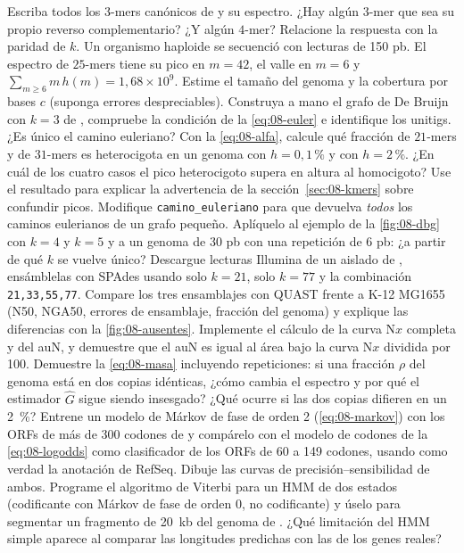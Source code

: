 \begin{ejercicios}
 Escriba todos los $3$-mers canónicos de  y su espectro. ¿Hay algún $3$-mer que sea su propio reverso complementario? ¿Y algún $4$-mer? Relacione la respuesta con la paridad de $k$.
 Un organismo haploide se secuenció con lecturas de 150 pb. El espectro de $25$-mers tiene su pico en $m=42$, el valle en $m=6$ y $\sum_{m\ge6} m\,h(m)=1{,}68\times10^{9}$. Estime el tamaño del genoma y la cobertura por bases $c$ (suponga errores despreciables).
 Construya a mano el grafo de De Bruijn con $k=3$ de , compruebe la condición de la \cref{eq:08-euler} e identifique los unitigs. ¿Es único el camino euleriano?
 Con la \cref{eq:08-alfa}, calcule qué fracción de $21$-mers y de $31$-mers es heterocigota en un genoma con $h=0{,}1\,\%$ y con $h=2\,\%$. ¿En cuál de los cuatro casos el pico heterocigoto supera en altura al homocigoto? Use el resultado para explicar la advertencia de la sección~\ref{sec:08-kmers} sobre confundir picos.
 Modifique \texttt{camino\_euleriano} para que devuelva \emph{todos} los caminos eulerianos de un grafo pequeño. Aplíquelo al ejemplo de la \cref{fig:08-dbg} con $k=4$ y $k=5$ y a un genoma de 30 pb con una repetición de 6 pb: ¿a partir de qué $k$ se vuelve único?
 Descargue lecturas Illumina de un aislado de , ensámblelas con SPAdes usando solo $k=21$, solo $k=77$ y la combinación \texttt{21,33,55,77}. Compare los tres ensamblajes con QUAST frente a K-12 MG1655 (N50, NGA50, errores de ensamblaje, fracción del genoma) y explique las diferencias con la \cref{fig:08-ausentes}.
 Implemente el cálculo de la curva N$x$ completa y del auN, y demuestre que el auN es igual al área bajo la curva N$x$ dividida por 100.
 Demuestre la \cref{eq:08-masa} incluyendo repeticiones: si una fracción $\rho$ del genoma está en dos copias idénticas, ¿cómo cambia el espectro y por qué el estimador $\widehat G$ sigue siendo insesgado? ¿Qué ocurre si las dos copias difieren en un \SI{2}{\percent}?
 Entrene un modelo de Márkov de fase de orden 2 (\cref{eq:08-markov}) con los ORFs de más de 300 codones de  y compárelo con el modelo de codones de la \cref{eq:08-logodds} como clasificador de los ORFs de 60 a 149 codones, usando como verdad la anotación de RefSeq. Dibuje las curvas de precisión--sensibilidad de ambos.
 Programe el algoritmo de Viterbi para un HMM de dos estados (codificante con Márkov de fase de orden 0, no codificante) y úselo para segmentar un fragmento de \SI{20}{kb} del genoma de . ¿Qué limitación del HMM simple aparece al comparar las longitudes predichas con las de los genes reales?
\end{ejercicios}

